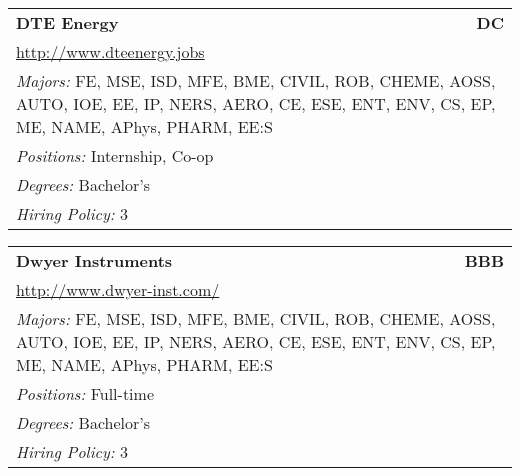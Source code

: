 \documentclass[twoside]{article}
\begin{document}
\begin{center}
\begin{multicols}{3}
\begin{FlushLeft}
\begin{minipage}{\columnwidth}
\end{minipage}
 
\begin{minipage}{\columnwidth}\begin{tabularx}{.95\columnwidth}{Xr}
                 {\Large\bf DTE Energy} & {\Large\bf DC}\\
    \multicolumn{2}{p{.95\columnwidth}}{\url{http://www.dteenergy.jobs}}\\
    \multicolumn{2}{p{.95\columnwidth}}{\emph{Majors:} FE, MSE, ISD, MFE, BME, CIVIL, ROB, CHEME, AOSS, AUTO, IOE, EE, IP, NERS, AERO, CE, ESE, ENT, ENV, CS, EP, ME, NAME, APhys, PHARM, EE:S}\\
    \multicolumn{2}{p{.95\columnwidth}}{\emph{Positions:} Internship, Co-op}\\
    \multicolumn{2}{p{.95\columnwidth}}{\emph{Degrees:} Bachelor's}\\
    \multicolumn{2}{p{.95\columnwidth}}{\emph{Hiring Policy:} 3}\\
    \end{tabularx}
    
\end{minipage}
 
\begin{minipage}{\columnwidth}\begin{tabularx}{.95\columnwidth}{Xr}
                 {\Large\bf Dwyer Instruments} & {\Large\bf BBB}\\
    \multicolumn{2}{p{.95\columnwidth}}{\url{http://www.dwyer-inst.com/}}\\
    \multicolumn{2}{p{.95\columnwidth}}{\emph{Majors:} FE, MSE, ISD, MFE, BME, CIVIL, ROB, CHEME, AOSS, AUTO, IOE, EE, IP, NERS, AERO, CE, ESE, ENT, ENV, CS, EP, ME, NAME, APhys, PHARM, EE:S}\\
    \multicolumn{2}{p{.95\columnwidth}}{\emph{Positions:} Full-time}\\
    \multicolumn{2}{p{.95\columnwidth}}{\emph{Degrees:} Bachelor's}\\
    \multicolumn{2}{p{.95\columnwidth}}{\emph{Hiring Policy:} 3}\\
    \end{tabularx}
    
\end{minipage}
 

\end{FlushLeft}
\end{multicols}
\end{center}
\end{document}
